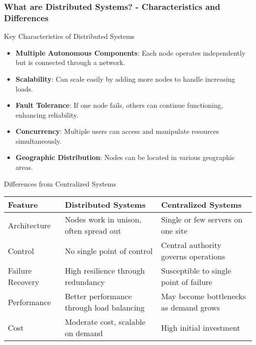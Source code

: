 \documentclass[aspectratio=169]{beamer}
\begin{document}
\begin{frame}[fragile]
    \frametitle{What are Distributed Systems? - Characteristics and Differences}
    \begin{block}{Key Characteristics of Distributed Systems}
        \begin{itemize}
            \item \textbf{Multiple Autonomous Components}: Each node operates independently but is connected through a network.
            \item \textbf{Scalability}: Can scale easily by adding more nodes to handle increasing loads.
            \item \textbf{Fault Tolerance}: If one node fails, others can continue functioning, enhancing reliability.
            \item \textbf{Concurrency}: Multiple users can access and manipulate resources simultaneously.
            \item \textbf{Geographic Distribution}: Nodes can be located in various geographic areas.
        \end{itemize}
    \end{block}

    \begin{block}{Differences from Centralized Systems}
        \begin{center}
            \begin{tabular}{|l|l|l|}
                \hline
                \textbf{Feature} & \textbf{Distributed Systems} & \textbf{Centralized Systems} \\
                \hline
                Architecture & Nodes work in unison, often spread out & Single or few servers on one site \\
                \hline
                Control & No single point of control & Central authority governs operations \\
                \hline
                Failure Recovery & High resilience through redundancy & Susceptible to single point of failure \\
                \hline
                Performance & Better performance through load balancing & May become bottlenecks as demand grows \\
                \hline
                Cost & Moderate cost, scalable on demand & High initial investment \\
                \hline
            \end{tabular}
        \end{center}
    \end{block}
\end{frame}
\end{document}

